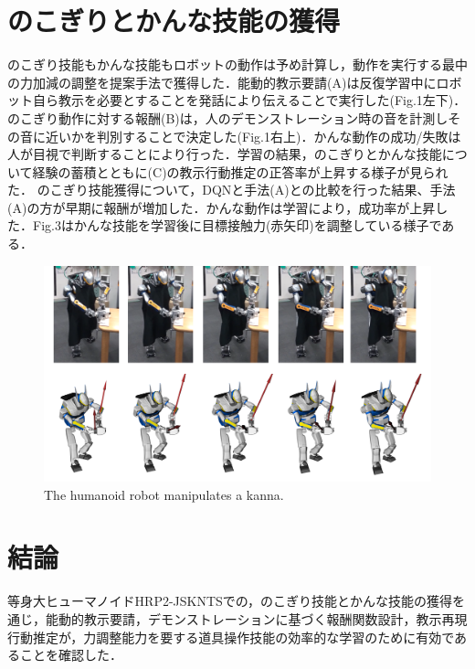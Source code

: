 \documentclass[twocolumn]{preport}
\begin{document}
\section{のこぎりとかんな技能の獲得}

のこぎり技能もかんな技能もロボットの動作は予め計算し，動作を実行する最中の力加減の調整を提案手法で獲得した．能動的教示要請(A)は反復学習中にロボット自ら教示を必要とすることを発話により伝えることで実行した(Fig.1左下)．のこぎり動作に対する報酬(B)は，人のデモンストレーション時の音を計測しその音に近いかを判別することで決定した(Fig.1右上)．かんな動作の成功/失敗は人が目視で判断することにより行った．学習の結果，のこぎりとかんな技能について経験の蓄積とともに(C)の教示行動推定の正答率が上昇する様子が見られた．
のこぎり技能獲得について，DQNと手法(A)との比較を行った結果、手法(A)の方が早期に報酬が増加した．かんな動作は学習により，成功率が上昇した．Fig.3はかんな技能を学習後に目標接触力(赤矢印)を調整している様子である．
\vspace*{-10pt}

\begin{figure}[tbh]
  \label{figure:kanna_motion}
  \begin{minipage}{1.0\columnwidth}
    \begin{center}
      \includegraphics[width=0.8\columnwidth]{kannna_short}
      \caption{The humanoid robot manipulates a kanna.}
    \end{center}
    \end{minipage}
\end{figure}
\vspace*{-20pt}
\section{結論}
等身大ヒューマノイドHRP2-JSKNTSでの，のこぎり技能とかんな技能の獲得を通じ，能動的教示要請，デモンストレーションに基づく報酬関数設計，教示再現行動推定が，力調整能力を要する道具操作技能の効率的な学習のために有効であることを確認した．





\end{document}
